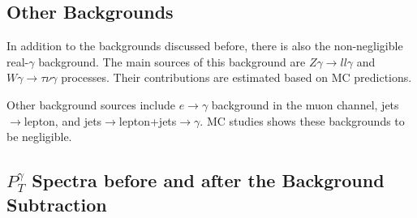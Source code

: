 


\subsection{Other Backgrounds}

In addition to the backgrounds discussed before, there is also the non-negligible real-$\gamma$ background. The main sources of this background are $Z\gamma \rightarrow ll\gamma$ and $W\gamma \rightarrow \tau \nu \gamma$ processes. Their contributions are estimated based on MC predictions. 

Other background sources include $e \rightarrow \gamma$ background in the muon channel, jets$\rightarrow$lepton, and jets$\rightarrow$lepton+jets$\rightarrow\gamma$. MC studies shows these backgrounds to be negligible.


\subsection{$P_T^{\gamma}$ Spectra before and after the Background Subtraction}
\label{sec:BackgroundSubtraction_results}

